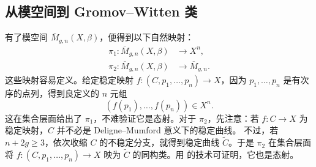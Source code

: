\subsection{从模空间到 Gromov--Witten 类}\label{subsec:moduli-to-gw}
有了模空间 $\overline M_{g,n}(X,\beta)$，便得到以下自然映射：
\begin{equation}\label{eq:stable-map-evaluation-forgetting}
\begin{aligned}
\pi_1:\overline M_{g,n}(X,\beta)&\longrightarrow X^n,\\
\pi_2:\overline M_{g,n}(X,\beta)&\longrightarrow\overline M_{g,n}.
\end{aligned}
\end{equation}
这些映射容易定义。给定稳定映射 $f:(C,p_1,\ldots,p_n)\to X$，因为 $p_1,\ldots,p_n$ 是有次序的点列，得到良定义的 $n$ 元组
\[
(f(p_1),\ldots,f(p_n))\in X^n.
\]
这在集合层面给出了 $\pi_1$，不难验证它是态射。对于 $\pi_2$，先注意：若 $f:C\to X$ 为稳定映射，$C$ 并不必是 Deligne--Mumford 意义下的稳定曲线。
不过，若 $n+2g\geq3$，依次收缩 $C$ 的不稳定分支，就得到稳定曲线 $\widetilde C$。于是 $\pi_2$ 在集合层面将 $f:(C,p_1,\ldots,p_n)\to X$ 映为 $\widetilde C$ 的同构类。用  的技术可证明，它也是态射。

